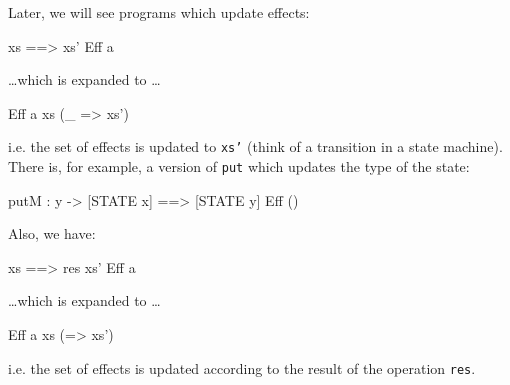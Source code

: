 \noindent
Later, we will see programs which update effects:

\begin{code}
{ xs ==> xs' } Eff a
\end{code}

\ldots which is expanded to \ldots

\begin{code}
Eff a xs (\_ => xs')
\end{code}

\noindent
i.e. the set of effects is updated to \texttt{xs'} (think of a transition
in a state machine). There is, for example, a version of \texttt{put} which
updates the type of the state:

\begin{code}
putM : y -> { [STATE x] ==> [STATE y] } Eff () 
\end{code}

\noindent
Also, we have:

\begin{code}
{ xs ==> {res} xs' } Eff a
\end{code}

\ldots which is expanded to \ldots

\begin{code}
Eff a xs (\res => xs')
\end{code}

\noindent
i.e. the set of effects is updated according to the result of the operation
\texttt{res}.




